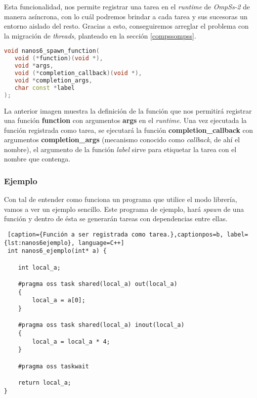 Esta funcionalidad, nos permite registrar una tarea en el \textit{runtime} de \textit{OmpSs-2} de manera asíncrona, con lo cuál podremos brindar a cada tarea y sus sucesoras un entorno aislado del resto. Gracias a esto, conseguiremos arreglar el problema con la migración de \textit{threads}, planteado en la sección \ref{compssompss}. \smallskip

\begin{lstlisting}[caption={Definición de la función nanos6\_spawn\_function.},captionpos=b, label={lst:nanos6spawn}, language=C++]
void nanos6_spawn_function(
   void (*function)(void *), 
   void *args,
   void (*completion_callback)(void *), 
   void *completion_args, 
   char const *label
);
\end{lstlisting}

La anterior imagen muestra la definición de la función que nos permitirá registrar una función \textbf{function} con argumentos \textbf{args} en el \textit{runtime}. Una vez ejecutada la función registrada como tarea, se ejecutará la función \textbf{completion\_callback} con argumentos \textbf{completion\_args} (mecanismo conocido como \textit{callback}, de ahí el nombre), el argumento de la función \textit{label} sirve para etiquetar la tarea con el nombre que contenga.

\subsubsection{Ejemplo}
\label{sec:ejemplo}

Con tal de entender como funciona un programa que utilice el modo librería, vamos a ver un ejemplo sencillo. Este programa de ejemplo, hará \textit{spawn} de una función y dentro de ésta se generarán tareas con dependencias entre ellas. \smallskip

\begin{lstlisting} [caption={Función a ser registrada como tarea.},captionpos=b, label={lst:nanos6ejemplo}, language=C++]
 int nanos6_ejemplo(int* a) {

    int local_a;

    #pragma oss task shared(local_a) out(local_a) 
    {
        local_a = a[0];
    }

    #pragma oss task shared(local_a) inout(local_a)
    {
        local_a = local_a * 4;
    }

    #pragma oss taskwait

    return local_a;
}
\end{lstlisting}

